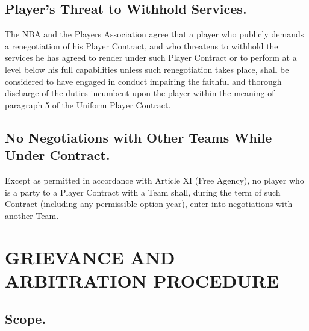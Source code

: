 \documentclass[
]{book}
\begin{document}
\hypertarget{players-threat-to-withhold-services.}{%
\section{Player's Threat to Withhold Services.}\label{players-threat-to-withhold-services.}}

The NBA and the Players Association agree that a player who publicly demands a renegotiation of his Player Contract, and who threatens to withhold the services he has agreed to render under such Player Contract or to perform at a level below his full capabilities unless such renegotiation takes place, shall be considered to have engaged in conduct impairing the faithful and thorough discharge of the duties incumbent upon the player within the meaning of paragraph 5 of the Uniform Player Contract.

\hypertarget{no-negotiations-with-other-teams-while-under-contract.}{%
\section{No Negotiations with Other Teams While Under Contract.}\label{no-negotiations-with-other-teams-while-under-contract.}}

Except as permitted in accordance with Article XI (Free Agency), no player who is a party to a Player Contract with a Team shall, during the term of such Contract (including any permissible option year), enter into negotiations with another Team.

\hypertarget{grievance-and-arbitration-procedure}{%
\chapter{GRIEVANCE AND ARBITRATION PROCEDURE}\label{grievance-and-arbitration-procedure}}

\hypertarget{scope.}{%
\section{Scope.}\label{scope.}}
\end{document}
